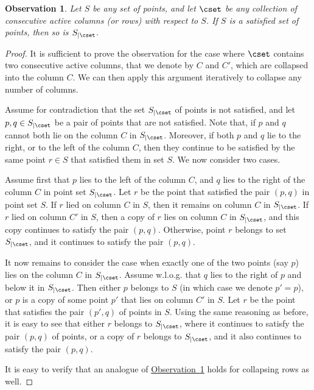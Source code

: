 \documentclass[11pt]{article}
\numberwithin{equation}{section}
\theoremstyle{definition}
\theoremstyle{plain}
\newcommand{\expref}[2]{\hyperref[#2]{#1~\ref{#2}}}
\newtheorem{myobs}[theorem]{Observation}
\begin{document}
\begin{myobs}\label{obs: collapsing columns}
Let $S$ be any set of points, and let $\cset$ be any collection of consecutive active columns (or rows) with respect to $S$. If $S$ is a satisfied set of points, then so is $S_{|\cset}$.
\end{myobs}
\begin{proof}
It is sufficient to prove the observation for the case where $\cset$ contains two consecutive active columns, that we denote by $C$ and $C'$, which are collapsed into the column $C$. We can then apply this argument iteratively to collapse any number of columns.

Assume for contradiction that the set $S_{|\cset}$ of points is not satisfied, and let $p,q\in S_{|\cset}$ be a pair of points that are not satisfied. Note that, if $p$ and $q$ cannot both lie on the column $C$ in $S_{|\cset}$. Moreover, if both $p$ and $q$ lie to the right, or to the left of the column $C$, then they continue to be satisfied by the same point $r\in S$ that satisfied them in set $S$. We now consider two cases.

Assume first that $p$ lies to the left of the column $C$, and $q$ lies to the right of the column $C$ in point set $S_{|\cset}$. Let $r$ be the point that satisfied the pair $(p,q)$ in point set $S$. If $r$ lied on column $C$ in $S$, then it remains on column $C$ in $S_{|\cset}$. If $r$ lied on column $C'$ in $S$, then a copy of $r$ lies on column $C$ in $S_{|\cset}$, and this copy continues to satisfy the pair $(p,q)$. Otherwise, point $r$ belongs to set $S_{|\cset}$, and it continues to satisfy the pair $(p,q)$.

It now remains to consider the case when exactly one of the two points (say $p$) lies on the column $C$ in $S_{|\cset}$. Assume w.l.o.g. that $q$ lies to the right of $p$ and below it in $S_{|\cset}$. Then either $p$ belongs to $S$ (in which case we denote $p'=p$), or $p$ is a copy of some point $p'$ that lies on column $C'$ in $S$. Let $r$ be the point that satisfies the pair $(p',q)$ of points in $S$. Using the same reasoning as before, it is easy to see that either $r$ belongs to $S_{|\cset}$, where it continues to satisfy the pair $(p,q)$ of points, or  a copy of $r$ belongs to $S_{|\cset}$, and it also continues to satisfy the pair $(p,q)$.

It is easy to verify that an analogue of \expref{Observation}{obs: collapsing columns} holds for collapsing rows as well.
\end{proof}
\end{document}

